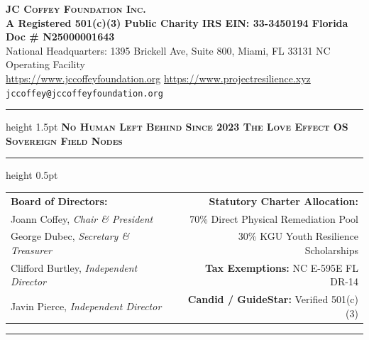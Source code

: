 \documentclass[11pt,letterpaper]{article}
\begin{document}
\begin{center}
    {\LARGE \textbf{\textsc{JC Coffey Foundation Inc.}}}\\[3pt]
    {\small \textbf{A Registered 501(c)(3) Public Charity \textperiodcentered{} IRS EIN: 33-3450194 \textperiodcentered{} Florida Doc \# N25000001643}}\\[2pt]
    {\footnotesize National Headquarters: 1395 Brickell Ave, Suite 800, Miami, FL 33131 \textbar{} NC Operating Facility}\\[2pt]
    {\footnotesize \url{https://www.jccoffeyfoundation.org} \textperiodcentered{} \url{https://www.projectresilience.xyz} \textperiodcentered{} \texttt{jccoffey@jccoffeyfoundation.org}}
    
    \vspace{6pt}
    \hrule height 1.5pt
    \vspace{2pt}
    {\scriptsize \textbf{\textsc{No Human Left Behind Since 2023 \textperiodcentered{} The Love Effect OS \textperiodcentered{} Sovereign Field Nodes}}}
    \vspace{2pt}
    \hrule height 0.5pt
\end{center}

\vspace{4pt}
\noindent
\begin{tabularx}{\textwidth}{@{}l X r@{}}
    \textbf{Board of Directors:} & & \textbf{Statutory Charter Allocation:}\\
    \textbullet{} Joann Coffey, \textit{Chair \& President} & & \textbullet{} 70\% Direct Physical Remediation Pool\\
    \textbullet{} George Dubec, \textit{Secretary \& Treasurer} & & \textbullet{} 30\% KGU Youth Resilience Scholarships\\
    \textbullet{} Clifford Burtley, \textit{Independent Director} & & \textbf{Tax Exemptions:} NC E-595E \textperiodcentered{} FL DR-14\\
    \textbullet{} Javin Pierce, \textit{Independent Director} & & \textbf{Candid / GuideStar:} Verified 501(c)(3)
\end{tabularx}

\vspace{12pt}
\hrule
\vspace{18pt}

\end{document}
